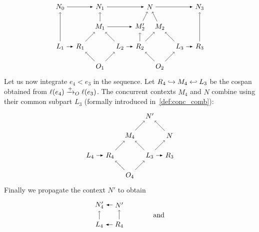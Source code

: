 \begin{example}
\[
\begin{tikzpicture} %
  \node (o1) at (0,-1) {\(O_1\)};
  \node (m1) at (0,1) {\(M_1\)};
  \node (r1) at (-1,0) {\(R_1\)};
  \node (l1) at (-2,0) {\(L_1\)};
  \node (l2) at (1,0) {\(L_2\)};
  \node (r2) at (2,0) {\(R_2\)};
  \node (o2) at (3,-1) {\(O_2\)};
  \node (m2) at (3,1) {\(M_2\)};
  \node (l3) at (4,0) {\(L_3\)};
  \node (r3) at (5,0) {\(R_3\)};
  \node (m2p) at (2,1) {\(M_2'\)};
  \node (n) at (2.5,2) {\(N\)};
  \node (n0) at (-2,2) {\(N_0\)};
  \node (n1) at (0,2) {\(N_1\)};
  \node (n3) at (5,2) {\(N_3\)};
  \draw [->] (o1) -- (r1);
  \draw [->] (o1) -- (l2);
  \draw [->] (r1) -- (m1);
  \draw [->] (l2) -- (m1);
  \draw [->] (o2) -- (r2);
  \draw [->] (o2) -- (l3);
  \draw [->] (r2) -- (m2);
  \draw [->] (l3) -- (m2);
  \draw [->] (m2) -- (n);
  \draw [->] (m2p) -- (n);
  \draw [->] (r2) -- (m2p);
  \draw [->] (l1) -- (n0);
  \draw [->] (m1) -- (n1);
  \draw [->] (r3) -- (n3);
  \draw [>=latex, ->] (l1) -- (r1);
  \draw [>=latex, ->] (l2) -- (r2);
  \draw [>=latex, ->] (l3) -- (r3);
  \draw [>=latex, ->] (m1) -- (m2p);
  \draw [>=latex, ->] (n0) -- (n1);
  \draw [>=latex, ->] (n1) -- (n);
  \draw [>=latex, ->] (n) -- (n3);
\end{tikzpicture}
\]
Let us now integrate $e_4<e_3$ in the sequence. Let $R_4\hookrightarrow M_4\hookleftarrow L_3$ be the cospan obtained from $\ell(e_4)\mathrel{\xrightarrow{+}}_O\ell(e_3)$.
The concurrent contexts $M_4$ and $N$ combine using their common subpart $L_3$ (formally introduced in~\autoref{def:conc_comb}):
\[
\begin{tikzpicture} %
  \node (l4) at (1,0) {\(L_4\)};
  \node (r4) at (2,0) {\(R_4\)};
  \node (o4) at (3,-1) {\(O_4\)};
  \node (m4) at (3,1) {\(M_4\)};
  \node (l3) at (4,0) {\(L_3\)};
  \node (r3) at (5,0) {\(R_3\)};
  \node (m2p) at (5,1) {\(N\)};
  \node (n) at (4,2) {\(N'\)};
  \draw [->] (o4) -- (r4);
  \draw [->] (o4) -- (l3);
  \draw [->] (r4) -- (m4);
  \draw [->] (l3) -- (m4);
  \draw [->] (m4) -- (n);
  \draw [->] (m2p) -- (n);
  \draw [->] (l3) -- (m2p);
  \draw [>=latex, ->] (l4) -- (r4);
  \draw [>=latex, ->] (l3) -- (r3);
\end{tikzpicture}
\]
Finally we propagate the context $N'$ to obtain
\[
\begin{tikzpicture} %
  \node (l4) at (1,0) {\(L_4\)};
  \node (r4) at (2,0) {\(R_4\)};
  \node (n4) at (1,1) {\(N_4'\)};
  \node (m4) at (2,1) {\(N'\)};
  \node (and) at (4,0.5) { and };
  \draw [>=latex, ->] (r4) -- (l4);
  \draw [>=latex, ->] (m4) -- (n4);
  \draw [->] (r4) -- (m4);
  \draw [->] (l4) -- (n4);

\end{tikzpicture}\]
\end{example}
